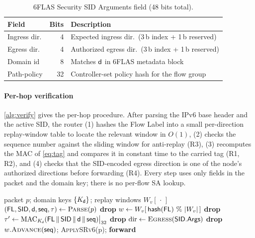 \begin{table}[t]
\centering
\caption{6FLAS Security SID Arguments field (48 bits total).}
\label{tab:args}
\renewcommand{\arraystretch}{1.2}
\begin{tabular}{lrl}
\toprule
\textbf{Field} & \textbf{Bits} & \textbf{Description} \\
\midrule
Ingress dir.   & 4  & Expected ingress dir.\ (3\,b index + 1\,b reserved) \\
Egress dir.    & 4  & Authorized egress dir.\ (3\,b index + 1\,b reserved) \\
Domain id      & 8  & Matches $\mathsf{d}$ in 6FLAS metadata block \\
Path-policy    & 32 & Controller-set policy hash for the flow group \\
\bottomrule
\end{tabular}
\end{table}

\paragraph{Per-hop verification}
\label{sec:perhop}
\cref{alg:verify} gives the per-hop procedure. After parsing the IPv6 base
header and the active SID, the router (1) hashes the Flow Label into a small
per-direction replay-window table to locate the relevant window in $O(1)$,
(2) checks the sequence number against the sliding window for anti-replay (R3),
(3) recomputes the MAC of \cref{eq:tag} and compares it in constant time to the
carried tag (R1, R2), and (4) checks that the SID-encoded egress direction is
one of the node's authorized directions before forwarding (R4). Every step uses
only fields in the packet and the domain key; there is no per-flow SA lookup.

\begin{algorithm}[t]
\caption{6FLAS per-hop verification at router $v$}
\label{alg:verify}
\begin{algorithmic}[1]
\Require packet $p$; domain keys $\{K_{\mathsf{d}}\}$; replay windows $W_v[\,\cdot\,]$
\State $(\mathsf{FL},\textsf{SID},\mathsf{d},\mathsf{seq},\tau) \gets \textsc{Parse}(p)$
 \State \textbf{drop} \EndIf
\State $w \gets W_v[\,\textsf{hash}(\mathsf{FL})\ \%\ |W_v|\,]$ 
    \State \textbf{drop} 
\EndIf
\State $\tau' \gets \operatorname{MAC}_{K_{\mathsf{d}}}(\mathsf{FL} \,\|\, \textsf{SID} \,\|\, \mathsf{d} \,\|\, \mathsf{seq})\big|_{32}$
 \State \textbf{drop}  \EndIf
\State $\text{dir} \gets \textsc{Egress}(\textsf{SID.Args})$
    \State \textbf{drop} 
\EndIf
\State $w.\textsc{Advance}(\mathsf{seq})$; \quad \textsc{ApplySRv6}(p); \quad \textbf{forward}
\end{algorithmic}
\end{algorithm}

